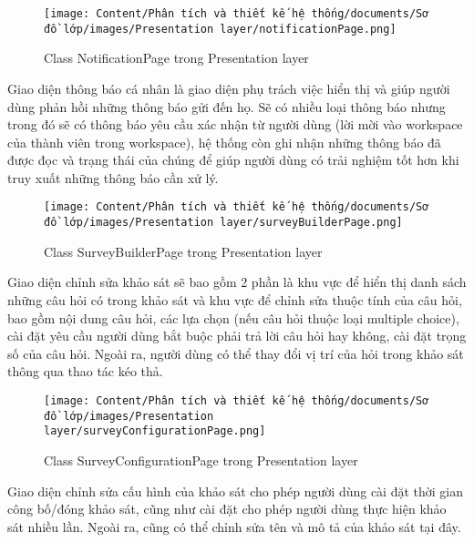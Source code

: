 \begin{figure}[H]
    \centering
    \texttt{[image: Content/Phân tích và thiết kế hệ thống/documents/Sơ đồ lớp/images/Presentation layer/notificationPage.png]}
    \vspace{0.5cm}
    \caption{Class NotificationPage trong Presentation layer}
    \label{fig:Class NotificationPage trong Presentation layer}
\end{figure}
Giao diện thông báo cá nhân là giao diện phụ trách việc hiển thị và giúp người dùng phản hồi những thông báo gửi đến họ. Sẽ có nhiều loại thông báo nhưng trong đó sẽ có thông báo yêu cầu xác nhận từ người dùng (lời mời vào workspace của thành viên trong workspace), hệ thống còn ghi nhận những thông báo đã được đọc và trạng thái của chúng để giúp người dùng có trải nghiệm tốt hơn khi truy xuất những thông báo cần xử lý.

\begin{figure}[H]
    \centering
    \texttt{[image: Content/Phân tích và thiết kế hệ thống/documents/Sơ đồ lớp/images/Presentation layer/surveyBuilderPage.png]}
    \vspace{0.5cm}
    \caption{Class SurveyBuilderPage trong Presentation layer}
    \label{fig:Class SurveyBuilderPage trong Presentation layer}
\end{figure}
Giao diện chỉnh sửa khảo sát sẽ bao gồm 2 phần là khu vực để hiển thị danh sách những câu hỏi có trong khảo sát và khu vực để chỉnh sửa thuộc tính của câu hỏi, bao gồm nội dung câu hỏi, các lựa chọn (nếu câu hỏi thuộc loại multiple choice), cài đặt yêu cầu người dùng bắt buộc phải trả lời câu hỏi hay không, cài đặt trọng số của câu hỏi. Ngoài ra, người dùng có thể thay đổi vị trí của hỏi trong khảo sát thông qua thao tác kéo thả.

\begin{figure}[H]
    \centering
    \texttt{[image: Content/Phân tích và thiết kế hệ thống/documents/Sơ đồ lớp/images/Presentation layer/surveyConfigurationPage.png]}
    \vspace{0.5cm}
    \caption{Class SurveyConfigurationPage trong Presentation layer}
    \label{fig:Class SurveyConfigurationPage trong Presentation layer}
\end{figure}
Giao diện chỉnh sửa cấu hình của khảo sát cho phép người dùng cài đặt thời gian công bố/đóng khảo sát, cũng như cài đặt cho phép người dùng thực hiện khảo sát nhiều lần. Ngoài ra, cũng có thể chỉnh sửa tên và mô tả của khảo sát tại đây.


